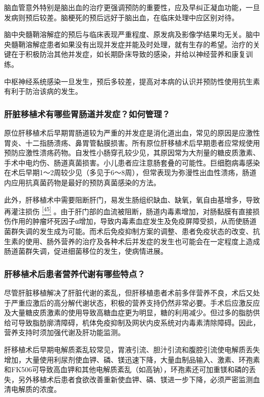 脑血管意外特别是脑出血的治疗更强调预防的重要性，应及早纠正凝血功能，一旦发病则预后较差。脑梗死的预后远好于脑出血，在临床处理中应区别对待。

脑中央髓鞘溶解症的预后与临床表现严重程度、原发病及影像学结果均无关。脑中央髓鞘溶解症患者如果没有出现并发症并能及时处理，就有生存的希望。治疗的关键在于积极防治其他并发症，如长期卧床导致的感染，并给以神经营养和康复训练。

中枢神经系统感染一旦发生，预后多较差，提高对本病的认识并预防性使用抗生素有利于防治该病的发生。

\subsubsection{肝脏移植术有哪些胃肠道并发症？如何管理？}

原位肝移植术后早期胃肠道较为严重的并发症是消化道出血，常见的原因是应激性胃炎、十二指肠溃疡、鼻胃管黏膜损害。所有原位肝移植术后早期患者应常规使用预防应激性溃疡药物。自发性小肠穿孔较少见，其原因常为大剂量的糖皮质激素、手术中电灼伤、肠道真菌损害。小儿患者应注意肠套叠的可能性。巨细胞病毒感染在术后早期1～2周较少见（多见于6～8周），但常表现为弥漫性出血性溃疡，肠道内应用抗真菌药物是最好的预防真菌感染的方法。

此外，肝移植术中需要阻断肝门，易发生肠组织缺血、缺氧，氧自由基增多，导致再灌注损伤
\protect\hyperlink{text00020.htmlux5cux23ch45-19}{\textsuperscript{{[}45{]}}}
。由于肝门部的血流被阻断，肠道内毒素增加，对肠黏膜有直接损伤作用的肿瘤坏死因子α增加，导致内毒素血症发生及免疫屏障受损，从而使肠道菌群失调的发生成为可能。而术后免疫抑制方案的调整、患者免疫状态的改变、抗生素的使用、肠外营养的治疗及各种术后并发症的发生也可能会在一定程度上造成肠道菌群失调，促进细菌移位的发生，使病情进展。

\subsubsection{肝移植术后患者营养代谢有哪些特点？}

尽管肝脏移植解决了肝脏代谢的紊乱，但肝移植患者术前多伴营养不良，术后又处于严重应激后的高分解代谢状态，积极的营养支持仍然非常必要。手术后应激反应及大量糖皮质激素的使用导致高糖血症更为明显，糖的利用减少。但过多的脂肪供给可导致脂肪廓清障碍，机体免疫抑制及网状内皮系统对内毒素清除障碍。因此，营养支持时须加强代谢及肝功能监测。

肝移植术后早期电解质紊乱较常见，胃液引流、胆汁引流和腹腔引流使电解质丢失增加，大量使用利尿剂使血钾、磷、镁迅速下降，大量血制品输入、激素、环孢素和FK506可导致高血钾和其他电解质紊乱（如高钠），环孢素还可加重镁和磷的丢失，另外移植术后患者食欲改善重新使血钾、磷、镁进一步下降，必须严密监测血清电解质的浓度。

